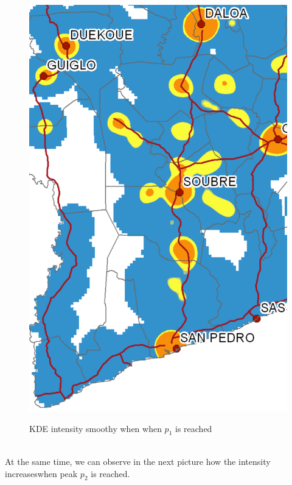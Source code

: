 \begin{figure}
{    \includegraphics[scale = 0.15]{results/images/kernel/l_hour8_kd_detail.pdf}
	\label{fig:subfig2_detail}
}
\caption[KDE intensity dynamic when $p_1$ is reached and central valley starts]{KDE intensity smoothy when when  $p_1$ is reached}
\label{fig:subfigureExample}
\end{figure}


\\

At the same time, we can observe in the next picture how the intensity increaseswhen peak $p_2$ is reached.

\\


